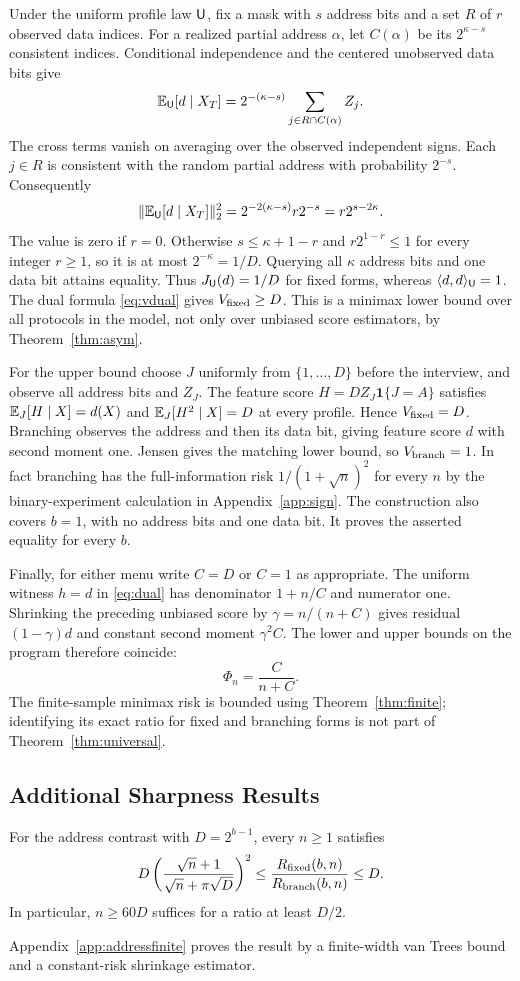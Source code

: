Under the uniform profile law $\mathsf U$, fix a mask with $s$ address bits and a set $R$ of $r$ observed data indices. For a realized partial address $\alpha$, let $C(\alpha)$ be its $2^{\kappa-s}$ consistent indices. Conditional independence and the centered unobserved data bits give
\[
 \mathbb{E}_\mathsf U[d\mid X_T]
      =2^{-(\kappa-s)}\sum_{j\in R\cap C(\alpha)} Z_j.
\]
The cross terms vanish on averaging over the observed independent signs. Each $j\in R$ is consistent with the random partial address with probability $2^{-s}$. Consequently
\[
 \|\mathbb{E}_\mathsf U[d\mid X_T]\|_2^2
   =2^{-2(\kappa-s)} r2^{-s}=r2^{s-2\kappa}.
\]
The value is zero if $r=0$. Otherwise $s\le \kappa+1-r$ and $r2^{1-r}\le1$ for every integer $r\ge1$, so it is at most $2^{-\kappa}=1/D$. Querying all $\kappa$ address bits and one data bit attains equality. Thus $J_\mathsf U(d)=1/D$ for fixed forms, whereas $\langle d,d\rangle_\mathsf U=1$. The dual formula \eqref{eq:vdual} gives $V_{\rm fixed}\ge D$. This is a minimax lower bound over all protocols in the model, not only over unbiased score estimators, by Theorem~\ref{thm:asym}.

For the upper bound choose $J$ uniformly from $\{1,\ldots,D\}$ before the interview, and observe all address bits and $Z_J$. The feature score $H=DZ_J\mathbf1\{J=A\}$ satisfies $\mathbb{E}_J[H\mid X]=d(X)$ and $\mathbb{E}_J[H^2\mid X]=D$ at every profile. Hence $V_{\rm fixed}=D$. Branching observes the address and then its data bit, giving feature score $d$ with second moment one. Jensen gives the matching lower bound, so $V_{\rm branch}=1$. In fact branching has the full-information risk $1/(1+\sqrt n)^2$ for every $n$ by the binary-experiment calculation in Appendix~\ref{app:sign}. The construction also covers $b=1$, with no address bits and one data bit. It proves the asserted equality for every $b$.

Finally, for either menu write $C=D$ or $C=1$ as appropriate. The uniform witness $h=d$ in \eqref{eq:dual} has denominator $1+n/C$ and numerator one. Shrinking the preceding unbiased score by $\gamma=n/(n+C)$ gives residual $(1-\gamma)d$ and constant second moment $\gamma^2 C$. The lower and upper bounds on the program therefore coincide:
\[
 \Phi_n=\frac{C}{n+C}.
\]
The finite-sample minimax risk is bounded using Theorem~\ref{thm:finite}; identifying its exact ratio for fixed and branching forms is not part of Theorem~\ref{thm:universal}.

\subsection{Additional Sharpness Results}
\begin{proposition}\label{prop:finiteaddress}
For the address contrast with $D=2^{b-1}$, every $n\ge1$ satisfies
\[
 D\left(\frac{\sqrt n+1}{\sqrt n+\pi\sqrt D}\right)^2
 \le\frac{R_{\rm fixed}(b,n)}{R_{\rm branch}(b,n)}\le D.
\]
In particular, $n\ge60D$ suffices for a ratio at least $D/2$.
\end{proposition}
Appendix~\ref{app:addressfinite} proves the result by a finite-width van Trees bound and a constant-risk shrinkage estimator.

